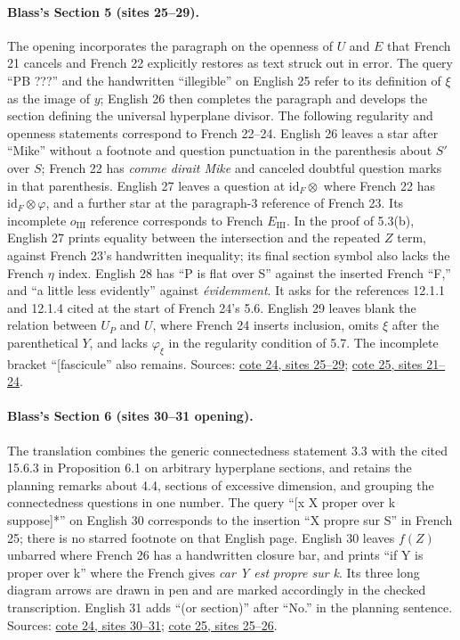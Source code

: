 \documentclass[10pt,a4paper]{article}
\begin{document}
\paragraph{Blass's Section 5 (sites 25--29).}
The opening incorporates the paragraph on the openness of $U$ and $E$ that French 21 cancels and French 22 explicitly restores as text struck out in error. The query ``PB ???'' and the handwritten ``illegible'' on English 25 refer to its definition of $\xi$ as the image of $y$; English 26 then completes the paragraph and develops the section defining the universal hyperplane divisor. The following regularity and openness statements correspond to French 22--24. English 26 leaves a star after ``Mike'' without a footnote and question punctuation in the parenthesis about $S'$ over $S$; French 22 has \emph{comme dirait Mike} and canceled doubtful question marks in that parenthesis. English 27 leaves a question at $\mathrm{id}_F\otimes$ where French 22 has $\mathrm{id}_F\otimes\varphi$, and a further star at the paragraph-3 reference of French 23. Its incomplete $o_{\mathrm{III}}$ reference corresponds to French $E_{\mathrm{III}}$. In the proof of 5.3(b), English 27 prints equality between the intersection and the repeated $Z$ term, against French 23's handwritten inequality; its final section symbol also lacks the French $\eta$ index. English 28 has ``P is flat over S'' against the inserted French ``F,'' and ``a little less evidently'' against \emph{évidemment}. It asks for the references 12.1.1 and 12.1.4 cited at the start of French 24's 5.6. English 29 leaves blank the relation between $U_P$ and $U$, where French 24 inserts inclusion, omits $\xi$ after the parenthetical $Y$, and lacks $\varphi_\xi$ in the regularity condition of 5.7. The incomplete bracket ``[fascicule'' also remains. Sources: \href{https://grothendieck.umontpellier.fr/web/viewer.html?file=../24.pdf\#page=26}{cote 24, sites 25--29}; \href{https://grothendieck.umontpellier.fr/web/viewer.html?file=../25.pdf\#page=22}{cote 25, sites 21--24}.

\paragraph{Blass's Section 6 (sites 30--31 opening).}
The translation combines the generic connectedness statement 3.3 with the cited 15.6.3 in Proposition 6.1 on arbitrary hyperplane sections, and retains the planning remarks about 4.4, sections of excessive dimension, and grouping the connectedness questions in one number. The query ``[x X proper over k suppose]*'' on English 30 corresponds to the insertion ``X propre sur S'' in French 25; there is no starred footnote on that English page. English 30 leaves $f(Z)$ unbarred where French 26 has a handwritten closure bar, and prints ``if Y is proper over k'' where the French gives \emph{car Y est propre sur k}. Its three long diagram arrows are drawn in pen and are marked accordingly in the checked transcription. English 31 adds ``(or section)'' after ``No.'' in the planning sentence. Sources: \href{https://grothendieck.umontpellier.fr/web/viewer.html?file=../24.pdf\#page=31}{cote 24, sites 30--31}; \href{https://grothendieck.umontpellier.fr/web/viewer.html?file=../25.pdf\#page=26}{cote 25, sites 25--26}.
\end{document}
